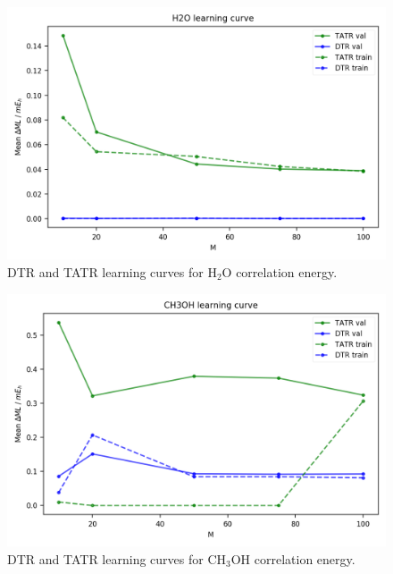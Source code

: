 \begin{figure}
    \centering
    \includegraphics[scale=1.0]{p2/figures/si/H2O_learn_e.png}
    \caption{DTR and TATR learning curves for H$_2$O correlation energy.}
\end{figure}

\begin{figure}
    \centering
    \includegraphics[scale=1.0]{p2/figures/si/CH3OH_learn_e.png}
    \caption{DTR and TATR learning curves for CH$_3$OH correlation energy.}
\end{figure}

